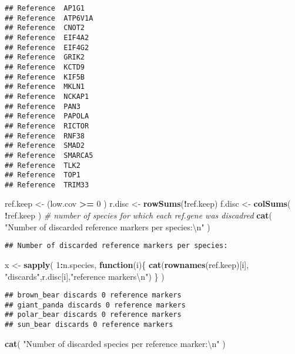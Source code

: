 \documentclass[]{article}
\newenvironment{Shaded}{\begin{snugshade}}{\end{snugshade}}
\newcommand{\KeywordTok}[1]{\textcolor[rgb]{0.13,0.29,0.53}{\textbf{#1}}}
\newcommand{\DecValTok}[1]{\textcolor[rgb]{0.00,0.00,0.81}{#1}}
\newcommand{\CharTok}[1]{\textcolor[rgb]{0.31,0.60,0.02}{#1}}
\newcommand{\StringTok}[1]{\textcolor[rgb]{0.31,0.60,0.02}{#1}}
\newcommand{\CommentTok}[1]{\textcolor[rgb]{0.56,0.35,0.01}{\textit{#1}}}
\newcommand{\ControlFlowTok}[1]{\textcolor[rgb]{0.13,0.29,0.53}{\textbf{#1}}}
\newcommand{\OperatorTok}[1]{\textcolor[rgb]{0.81,0.36,0.00}{\textbf{#1}}}
\newcommand{\NormalTok}[1]{#1}
\begin{document}
\begin{verbatim}
## Reference  AP1G1 
## Reference  ATP6V1A 
## Reference  CNOT2 
## Reference  EIF4A2 
## Reference  EIF4G2 
## Reference  GRIK2 
## Reference  KCTD9 
## Reference  KIF5B 
## Reference  MKLN1 
## Reference  NCKAP1 
## Reference  PAN3 
## Reference  PAPOLA 
## Reference  RICTOR 
## Reference  RNF38 
## Reference  SMAD2 
## Reference  SMARCA5 
## Reference  TLK2 
## Reference  TOP1 
## Reference  TRIM33
\end{verbatim}

\begin{Shaded}
\begin{Highlighting}[]
\NormalTok{ref.keep <-}\StringTok{ }\NormalTok{(low.cov }\OperatorTok{>=}\StringTok{ }\DecValTok{0}\NormalTok{ )}
\NormalTok{r.disc <-}\StringTok{ }\KeywordTok{rowSums}\NormalTok{(}\OperatorTok{!}\NormalTok{ref.keep)}
\NormalTok{f.disc <-}\StringTok{ }\KeywordTok{colSums}\NormalTok{( }\OperatorTok{!}\NormalTok{ref.keep )                                }\CommentTok{# number of species for which each ref.gene was discadred   }
\KeywordTok{cat}\NormalTok{( }\StringTok{"Number of discarded reference markers per species:}\CharTok{\textbackslash{}n}\StringTok{"}\NormalTok{ )}
\end{Highlighting}
\end{Shaded}

\begin{verbatim}
## Number of discarded reference markers per species:
\end{verbatim}

\begin{Shaded}
\begin{Highlighting}[]
\NormalTok{x <-}\StringTok{ }\KeywordTok{sapply}\NormalTok{( }\DecValTok{1}\OperatorTok{:}\NormalTok{n.species, }\ControlFlowTok{function}\NormalTok{(i)\{}
  \KeywordTok{cat}\NormalTok{(}\KeywordTok{rownames}\NormalTok{(ref.keep)[i], }\StringTok{"discards"}\NormalTok{,r.disc[i],}\StringTok{"reference markers}\CharTok{\textbackslash{}n}\StringTok{"}\NormalTok{)}
\NormalTok{\} )}
\end{Highlighting}
\end{Shaded}

\begin{verbatim}
## brown_bear discards 0 reference markers
## giant_panda discards 0 reference markers
## polar_bear discards 0 reference markers
## sun_bear discards 0 reference markers
\end{verbatim}

\begin{Shaded}
\begin{Highlighting}[]
\KeywordTok{cat}\NormalTok{( }\StringTok{"Number of discarded species per reference marker:}\CharTok{\textbackslash{}n}\StringTok{"}\NormalTok{ )}
\end{Highlighting}
\end{Shaded}
\end{document}
